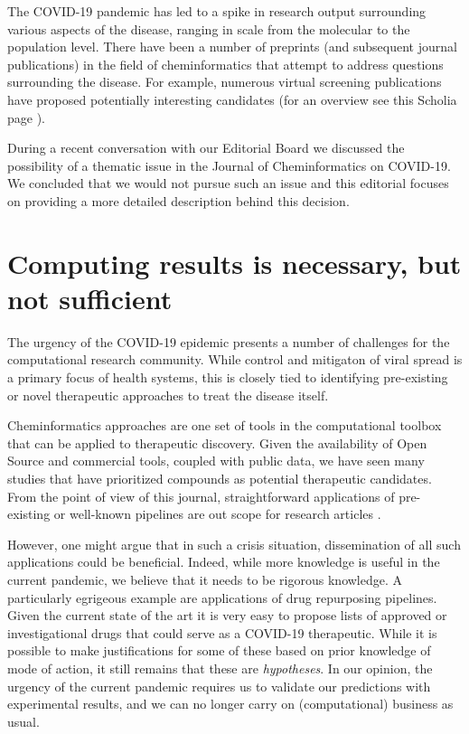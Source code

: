 \documentclass{bmcart}
\begin{document}
The COVID-19 pandemic has led to a spike in research output
\cite{covidlit} surrounding various aspects of the disease, ranging in
scale from the molecular to the population level.  There have been a
number of preprints (and subsequent journal publications) in the field
of cheminformatics that attempt to address questions surrounding the
disease. For example, numerous virtual screening publications have
proposed potentially interesting candidates (for an overview see
this Scholia page \cite{scholia}).

During a recent conversation with our Editorial Board we discussed the
possibility of a thematic issue in the Journal of Cheminformatics on
COVID-19. We concluded that we would not pursue such an issue and this
editorial focuses on providing a more detailed description behind this
decision.

\section*{Computing results is necessary, but not sufficient}

The urgency of the COVID-19 epidemic presents a number of challenges
for the computational research community. While control and mitigaton
of viral spread is a primary focus of health systems, this is closely
tied to identifying pre-existing or novel therapeutic approaches to
treat the disease itself. 

Cheminformatics approaches are one set of tools in the computational
toolbox that can be applied to therapeutic discovery. Given the
availability of Open Source and commercial tools, coupled with public
data, we have seen many studies that have prioritized compounds as
potential therapeutic candidates. From the point of view of this
journal, straightforward applications of pre-existing or well-known
pipelines are out scope for research articles \cite{jcheminf_scope}.

However, one might argue that in such a crisis situation,
dissemination of all such applications could be beneficial. Indeed,
while more knowledge is useful in the current pandemic, we believe
that it needs to be rigorous knowledge. A particularly egrigeous
example are applications of drug repurposing pipelines. Given the
current state of the art it is very easy to propose lists of approved
or investigational drugs that could serve as a COVID-19
therapeutic. While it is possible to make justifications for some of
these based on prior knowledge of mode of action, it still remains
that these are \emph{hypotheses}. In our opinion, the urgency of the
current pandemic requires us to validate our predictions with
experimental results, and we can no longer carry on (computational)
business as usual.
\end{document}
